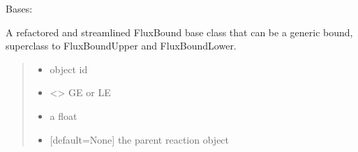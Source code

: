 \documentclass[letterpaper,12pt,english]{sphinxmanual}
\begin{document}
\begin{fulllineitems}
\label{\detokenize{api/core:cbmpy.CBModel.FluxBoundBase}}
\pysigstartsignatures
\pysiglinewithargsret
{}
{\sphinxparamcomma {}\sphinxparamcomma {}\sphinxparamcomma {}}
{}
\pysigstopsignatures
\sphinxAtStartPar
Bases: {\hyperref[\detokenize{api/core:cbmpy.CBModel.Fbase}]{}}

\sphinxAtStartPar
A refactored and streamlined FluxBound base class that can be a generic bound,
superclass to FluxBoundUpper and FluxBoundLower.

\begin{fulllineitems}
\label{\detokenize{api/core:cbmpy.CBModel.FluxBoundBase.__init__}}
\pysigstartsignatures
\pysiglinewithargsret
{}
{\sphinxparamcomma {}\sphinxparamcomma {}\sphinxparamcomma {}}
{}
\pysigstopsignatures\begin{quote}\begin{description}
\begin{itemize}
\item {} 
\sphinxAtStartPar
{} \textendash{} object id

\item {} 
\sphinxAtStartPar
{} \textendash{} \textless{}\textgreater{} GE or LE

\item {} 
\sphinxAtStartPar
{} \textendash{} a float

\item {} 
\sphinxAtStartPar
{} \textendash{} {[}default=None{]} the parent reaction object

\end{itemize}


\end{description}
\end{quote}
\end{fulllineitems}
\end{fulllineitems}
\end{document}
